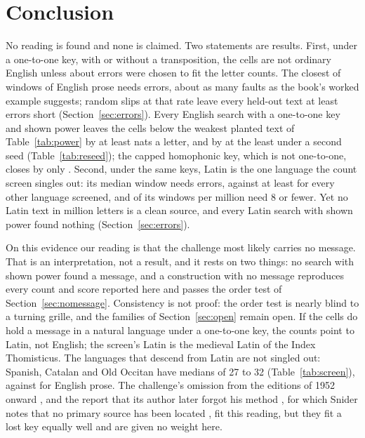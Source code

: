 \documentclass[11pt]{article}
\theoremstyle{definition}
\begin{document}
\section{Conclusion}\label{sec:conclusion}

No reading is found and none is claimed. Two statements are results. First, under a one-to-one key, with or without a transposition, the cells are not ordinary English unless about \corpusClosestDistance{} errors were chosen to fit the letter counts. The closest of \corpusWindows{} windows of English prose needs \corpusClosestDistance{} errors, about as many faults as the book's worked example suggests; random slips at that rate leave every held-out text at least \errRandomFewest{} errors short (Section~\ref{sec:errors}). Every English search with a one-to-one key and shown power leaves the cells below the weakest planted text of Table~\ref{tab:power} by at least \gapEnglishLow{} nats a letter, and by \rsEnglishLow{} at the least under a second seed (Table~\ref{tab:reseed}); the capped homophonic key, which is not one-to-one, closes by only \gapHomTab{}. Second, under the same keys, Latin is the one language the count screen singles out: its median window needs \allLatinMedian{} errors, against at least \allOthersMedianLow{} for every other language screened, and \allLatinRate{} of its windows per million need 8 or fewer. Yet no Latin text in \latinLettersAll{} million letters is a clean source, and every Latin search with shown power found nothing (Section~\ref{sec:errors}).

On this evidence our reading is that the challenge most likely carries no message. That is an interpretation, not a result, and it rests on two things: no search with shown power found a message, and a construction with no message reproduces every count and score reported here and passes the order test of Section~\ref{sec:nomessage}. Consistency is not proof: the order test is nearly blind to a turning grille, and the families of Section~\ref{sec:open} remain open. If the cells do hold a message in a natural language under a one-to-one key, the counts point to Latin, not English; the screen's Latin is the medieval Latin of the Index Thomisticus. The languages that descend from Latin are not singled out: Spanish, Catalan and Old Occitan have medians of 27 to 32 (Table~\ref{tab:screen}), against \corpusMedianErrors{} for English prose. The challenge's omission from the editions of 1952 onward \cite{numberworld2015}, and the report that its author later forgot his method \cite{wikipedia2026}, for which Snider notes that no primary source has been located \cite{snider2026}, fit this reading, but they fit a lost key equally well and are given no weight here.
\end{document}
